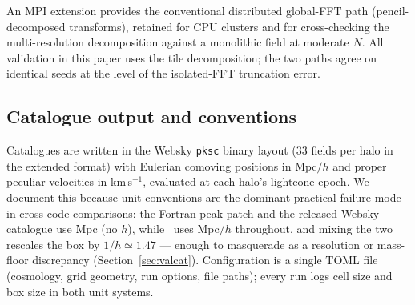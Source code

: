 An MPI extension provides the conventional distributed global-FFT path
(pencil-decomposed transforms), retained for CPU clusters and for
cross-checking the multi-resolution decomposition against a monolithic field
at moderate $N$. All validation in this paper uses the tile decomposition;
the two paths agree on identical seeds at the level of the isolated-FFT
truncation error. 

\subsection{Catalogue output and conventions}
\label{sec:impl-io}

Catalogues are written in the Websky \texttt{pksc} binary layout (33 fields
per halo in the extended format) with Eulerian comoving positions in Mpc$/h$
and proper peculiar velocities in km\,s$^{-1}$, evaluated at each halo's
lightcone epoch. We document this because unit conventions are the dominant
practical failure mode in cross-code comparisons: the Fortran peak patch and
the released Websky catalogue use Mpc (no $h$), while \ppjl\ uses Mpc$/h$
throughout, and mixing the two rescales the box by $1/h\simeq1.47$ --- enough
to masquerade as a resolution or mass-floor discrepancy
(Section~\ref{sec:valcat}). Configuration is a single TOML file (cosmology,
grid geometry, run options, file paths); every run logs cell size and box
size in both unit systems.
